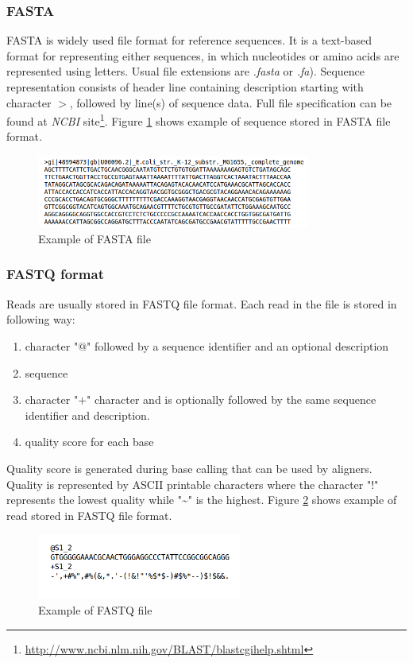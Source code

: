 \documentclass[times, utf8, diplomski, numeric, english]{fer}
\begin{document}
\subsubsection{FASTA}


FASTA is widely used file format for reference sequences. It is a text-based format for representing either sequences, in which nucleotides or amino acids are represented using letters. Usual file extensions are \textit{.fasta} or \textit{.fa}).
Sequence representation consists of header line containing description starting with character $ > $, followed by line(s) of sequence data. Full file specification can be found at \textit{NCBI} site\footnote{\url{http://www.ncbi.nlm.nih.gov/BLAST/blastcgihelp.shtml}}.
Figure \ref{fg:fsta} shows example of sequence stored in FASTA file format.
\begin{figure}[!ht]
	\begin{center}
		\includegraphics[width=0.8\textwidth]{./imgs/fasta.png}
		\caption{Example of FASTA file}
		\label{fg:fsta}
	\end{center}
\end{figure} 

\subsubsection{FASTQ format}
Reads are usually stored in FASTQ file format. Each read in the file is stored in following way:
\begin{enumerate}
	\item character "$@$" followed  by a sequence identifier and an optional description 
	\item sequence
	\item character "$+$" character and is optionally followed by the same sequence identifier and description.
	\item quality score for each base
\end{enumerate}
Quality score is generated during base calling that can be used by aligners. Quality is represented by ASCII printable characters where
the character "$!$" represents the lowest quality while "\textasciitilde" is the highest. Figure \ref{fg:fq} shows example of read stored in FASTQ file format.
\begin{figure}[!ht]
	\begin{center}
		\includegraphics[width=0.6\textwidth]{./imgs/fq.png}
		\caption{Example of FASTQ file}
		\label{fg:fq}
	\end{center}
\end{figure} 
\end{document}
